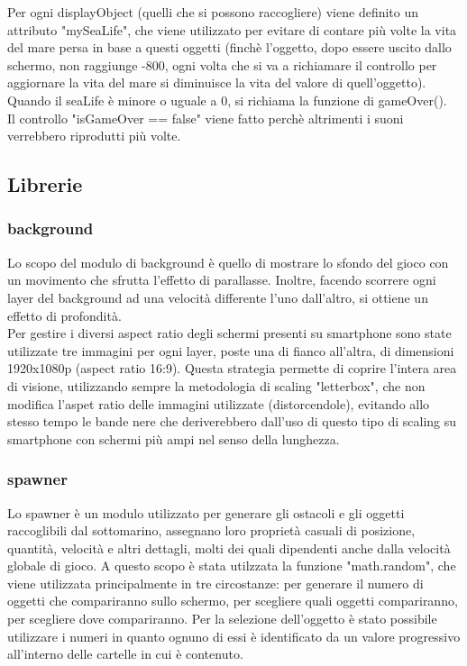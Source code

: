 \documentclass[15pt]{article}
\begin{document}
Per ogni displayObject (quelli che si possono raccogliere) viene definito un attributo "mySeaLife", che viene utilizzato per evitare di contare più volte la vita del mare persa in base a questi oggetti (finchè l'oggetto, dopo essere uscito dallo schermo, non raggiunge -800, ogni volta che si va a richiamare il controllo per aggiornare la vita del mare si diminuisce la vita del valore di quell'oggetto). Quando il seaLife è minore o uguale a 0, si richiama la funzione di gameOver().\\

Il controllo "isGameOver == false" viene fatto perchè altrimenti i suoni verrebbero riprodutti più volte.

\subsection{Librerie}
\subsubsection{background}
Lo scopo del modulo di background è quello di mostrare lo sfondo del gioco con un movimento che sfrutta l'effetto di parallasse. Inoltre, facendo scorrere ogni layer del background ad una velocità differente l'uno dall'altro, si ottiene un effetto di profondità.\\

Per gestire i diversi aspect ratio degli schermi presenti su smartphone sono state utilizzate tre immagini per ogni layer, poste una di fianco all'altra, di dimensioni 1920x1080p (aspect ratio 16:9). Questa strategia permette di coprire l'intera area di visione, utilizzando sempre la metodologia di scaling "letterbox", che non modifica l'aspet ratio delle immagini utilizzate (distorcendole), evitando allo stesso tempo le bande nere che deriverebbero dall'uso di questo tipo di scaling su smartphone con schermi più ampi nel senso della lunghezza.

\subsubsection{spawner}
Lo spawner è un modulo utilizzato per generare gli ostacoli e gli oggetti raccoglibili dal sottomarino, assegnano loro proprietà casuali di posizione, quantità, velocità e altri dettagli, molti dei quali dipendenti anche dalla velocità globale di gioco. A questo scopo è stata utilzzata la funzione "math.random", che viene utilizzata principalmente in tre circostanze: per generare il numero di oggetti che compariranno sullo schermo, per scegliere quali oggetti compariranno, per scegliere dove compariranno. Per la selezione dell’oggetto è stato possibile utilizzare i numeri in quanto ognuno di essi è identificato da un valore progressivo all'interno delle cartelle in cui è contenuto.
\end{document}
